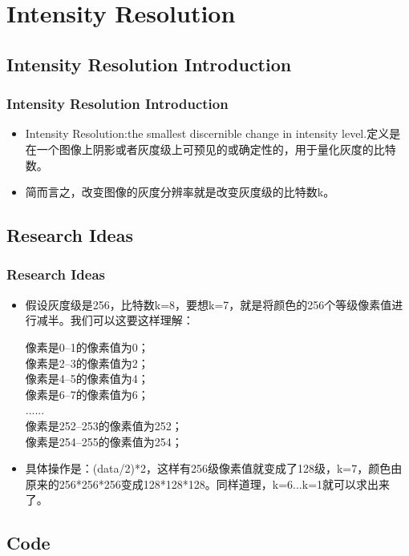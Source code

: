 \documentclass[notheorems,serif,table,compress]{beamer}  %
\begin{document}
\section{Intensity Resolution}

\subsection{Intensity Resolution Introduction}
\begin{frame}
\frametitle{Intensity Resolution Introduction}
\begin{itemize}
\item {\color{blue}Intensity Resolution:}the smallest discernible change in intensity level.定义是在一个图像上阴影或者灰度级上可预见的或确定性的，用于量化灰度的比特数。
\item 简而言之，改变图像的灰度分辨率就是改变灰度级的比特数k。

\end {itemize}
\end{frame}

\subsection{Research Ideas}
\begin{frame}
\frametitle{Research Ideas}
    \begin{itemize}
\item {\color{blue}假设灰度级是256，比特数k=8，要想k=7，就是将颜色的256个等级像素值进行减半。我们可以这要这样理解：

 像素是0--1的像素值为0；\\
 像素是2--3的像素值为2；\\
 像素是4--5的像素值为4；\\
 像素是6--7的像素值为6；\\
......\\
 像素是252--253的像素值为252；\\
 像素是254--255的像素值为254；\\}
\item {\color{blue}具体操作是：}{\color{red}(data/2)*2}{\color{blue}，这样有256级像素值就变成了128级，k=7，颜色由原来的256*256*256变成128*128*128。同样道理，k=6...k=1就可以求出来了。}
\end{itemize}
\end{frame}
\subsection{Code}
\end{document}
